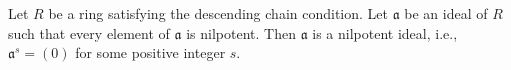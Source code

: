 Let $R$ be a ring satisfying the descending chain condition. Let $\mathfrak{a}$ be an ideal of $R$ such that every element of $\mathfrak{a}$ is nilpotent. Then $\mathfrak{a}$ is a nilpotent ideal, i.e., $\mathfrak{a}^s = (0)$ for some positive integer $s$.
